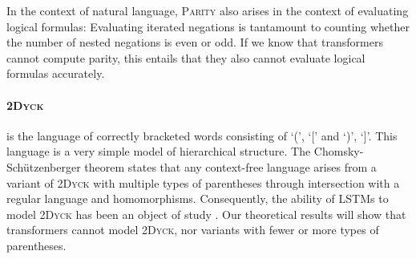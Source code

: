 \documentclass[11pt,a4paper]{article}
\newcounter{theorem}
\begin{document}
In the context of natural language, \textsc{Parity} also arises in the context of evaluating logical formulas:
Evaluating iterated negations is tantamount to counting whether the number of nested negations is even or odd.
If we know that transformers cannot compute parity, this entails that they also cannot evaluate logical formulas accurately.









%
%


\paragraph{\textsc{2Dyck}} is the language of correctly bracketed words consisting of `(', `[' and `)', `]'.
This language is a very simple model of hierarchical structure.
The Chomsky-Sch{\"u}tzenberger theorem states that any context-free language arises from a variant of \textsc{2Dyck} with multiple types of parentheses through intersection with a regular language and homomorphisms.
Consequently, the ability of LSTMs to model \textsc{2Dyck} has been an object of study \cite{sennhauser2018evaluating,bernardy2018can}.
Our theoretical results will show that transformers cannot model \textsc{2Dyck}, nor variants with fewer or more types of parentheses.
\end{document}
